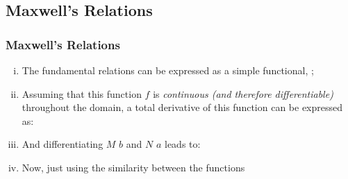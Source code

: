 \documentclass[10pt,compress,unknownkeysallowed]{beamer}
\begin{document}
\subsection{Maxwell's Relations}\label{Module03:Section:MaxwellRelation}

\begin{frame}
  \frametitle{Maxwell's Relations}
      \begin{enumerate}[i)]
          \item<1-> The fundamental relations can be expressed as a simple functional, ;
          \item<2-> Assuming that this function $f$ is {\it continuous (and therefore differentiable)} throughout the domain, a total derivative of this function can be expressed as: 
          \item<3-> And differentiating $M$ \wrt $b$ and $N$ \wrt $a$ leads to:
          \item<4-> Now, just using the similarity between the functions
      \end{enumerate}

\end{frame}
\normalsize
\end{document}
